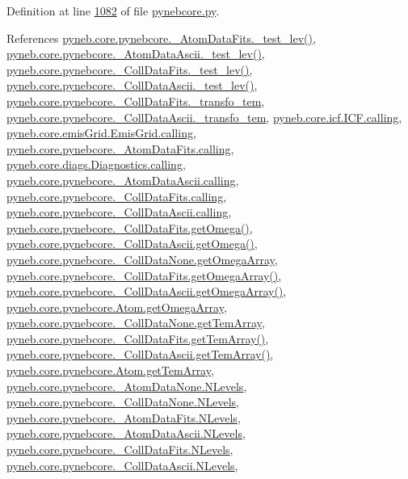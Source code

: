 Definition at line \hyperlink{pynebcore_8py_source_l01082}{1082} of file \hyperlink{pynebcore_8py_source}{pynebcore.\-py}.



References \hyperlink{pynebcore_8py_source_l00178}{pyneb.\-core.\-pynebcore.\-\_\-\-Atom\-Data\-Fits.\-\_\-test\-\_\-lev()}, \hyperlink{pynebcore_8py_source_l00447}{pyneb.\-core.\-pynebcore.\-\_\-\-Atom\-Data\-Ascii.\-\_\-test\-\_\-lev()}, \hyperlink{pynebcore_8py_source_l00677}{pyneb.\-core.\-pynebcore.\-\_\-\-Coll\-Data\-Fits.\-\_\-test\-\_\-lev()}, \hyperlink{pynebcore_8py_source_l01045}{pyneb.\-core.\-pynebcore.\-\_\-\-Coll\-Data\-Ascii.\-\_\-test\-\_\-lev()}, \hyperlink{pynebcore_8py_source_l00606}{pyneb.\-core.\-pynebcore.\-\_\-\-Coll\-Data\-Fits.\-\_\-transfo\-\_\-tem}, \hyperlink{pynebcore_8py_source_l00963}{pyneb.\-core.\-pynebcore.\-\_\-\-Coll\-Data\-Ascii.\-\_\-transfo\-\_\-tem}, \hyperlink{icf_8py_source_l00016}{pyneb.\-core.\-icf.\-I\-C\-F.\-calling}, \hyperlink{emis_grid_8py_source_l00044}{pyneb.\-core.\-emis\-Grid.\-Emis\-Grid.\-calling}, \hyperlink{pynebcore_8py_source_l00097}{pyneb.\-core.\-pynebcore.\-\_\-\-Atom\-Data\-Fits.\-calling}, \hyperlink{diags_8py_source_l00169}{pyneb.\-core.\-diags.\-Diagnostics.\-calling}, \hyperlink{pynebcore_8py_source_l00318}{pyneb.\-core.\-pynebcore.\-\_\-\-Atom\-Data\-Ascii.\-calling}, \hyperlink{pynebcore_8py_source_l00585}{pyneb.\-core.\-pynebcore.\-\_\-\-Coll\-Data\-Fits.\-calling}, \hyperlink{pynebcore_8py_source_l00936}{pyneb.\-core.\-pynebcore.\-\_\-\-Coll\-Data\-Ascii.\-calling}, \hyperlink{pynebcore_8py_source_l00828}{pyneb.\-core.\-pynebcore.\-\_\-\-Coll\-Data\-Fits.\-get\-Omega()}, \hyperlink{pynebcore_8py_source_l01082}{pyneb.\-core.\-pynebcore.\-\_\-\-Coll\-Data\-Ascii.\-get\-Omega()}, \hyperlink{pynebcore_8py_source_l00074}{pyneb.\-core.\-pynebcore.\-\_\-\-Coll\-Data\-None.\-get\-Omega\-Array}, \hyperlink{pynebcore_8py_source_l00800}{pyneb.\-core.\-pynebcore.\-\_\-\-Coll\-Data\-Fits.\-get\-Omega\-Array()}, \hyperlink{pynebcore_8py_source_l01058}{pyneb.\-core.\-pynebcore.\-\_\-\-Coll\-Data\-Ascii.\-get\-Omega\-Array()}, \hyperlink{pynebcore_8py_source_l01283}{pyneb.\-core.\-pynebcore.\-Atom.\-get\-Omega\-Array}, \hyperlink{pynebcore_8py_source_l00075}{pyneb.\-core.\-pynebcore.\-\_\-\-Coll\-Data\-None.\-get\-Tem\-Array}, \hyperlink{pynebcore_8py_source_l00897}{pyneb.\-core.\-pynebcore.\-\_\-\-Coll\-Data\-Fits.\-get\-Tem\-Array()}, \hyperlink{pynebcore_8py_source_l01129}{pyneb.\-core.\-pynebcore.\-\_\-\-Coll\-Data\-Ascii.\-get\-Tem\-Array()}, \hyperlink{pynebcore_8py_source_l01284}{pyneb.\-core.\-pynebcore.\-Atom.\-get\-Tem\-Array}, \hyperlink{pynebcore_8py_source_l00069}{pyneb.\-core.\-pynebcore.\-\_\-\-Atom\-Data\-None.\-N\-Levels}, \hyperlink{pynebcore_8py_source_l00082}{pyneb.\-core.\-pynebcore.\-\_\-\-Coll\-Data\-None.\-N\-Levels}, \hyperlink{pynebcore_8py_source_l00098}{pyneb.\-core.\-pynebcore.\-\_\-\-Atom\-Data\-Fits.\-N\-Levels}, \hyperlink{pynebcore_8py_source_l00319}{pyneb.\-core.\-pynebcore.\-\_\-\-Atom\-Data\-Ascii.\-N\-Levels}, \hyperlink{pynebcore_8py_source_l00586}{pyneb.\-core.\-pynebcore.\-\_\-\-Coll\-Data\-Fits.\-N\-Levels}, \hyperlink{pynebcore_8py_source_l00933}{pyneb.\-core.\-pynebcore.\-\_\-\-Coll\-Data\-Ascii.\-N\-Levels}, 
